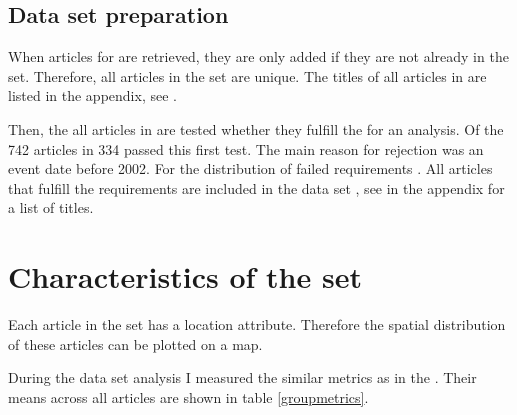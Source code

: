 \subsection{Data set preparation}

When articles for  are retrieved, they are only added if they are not already in the set. 
Therefore, all articles in the set are unique.
The titles of all articles in  are listed in the appendix, see .

Then, the all articles in  are tested whether they fulfill the  for an analysis.
Of the 742 articles in  334 passed this first test.
The main reason for rejection was an event date before 2002. 
For the distribution of failed requirements .
All articles that fulfill the requirements are included in the data set , see  in the appendix for a list of titles.



%

\section{Characteristics of the set}

Each article in the set has a location attribute. 
Therefore the spatial distribution of these articles can be plotted on a map.


During the data set analysis I measured the similar metrics as in the .
Their means across all articles are shown in table \ref{groupmetrics}.

